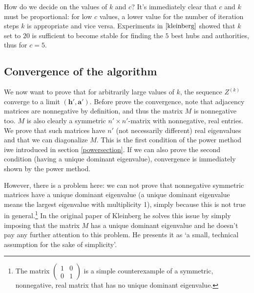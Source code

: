\documentclass[a4paper,11pt]{report}
\begin{document}
How do we decide on the values of $k$ and $c$? It's immediately clear that $c$ and $k$ must
be proportional: for low $c$ values, a lower 
value for the number of iteration steps $k$ is appropriate and vice versa. 
Experiments in $\cite{kleinberg}$ showed that $k$ set to $20$ is sufficient to 
become stable for finding the $5$ best hubs and authorities, thus for $c = 5$. 

\subsection{Convergence of the algorithm}
We now want to prove that for arbitrarily large values of $k$, the
sequence $Z^{(k)}$ converge to a limit $(\mathbf{h'}, \mathbf{a'})$. Before 
  prove the convergence, note that  adjacency matrices are nonnegative by definition, and thus the matrix $M$ is 
nonnegative too. $M$ is also clearly a symmetric $n' \times n'$-matrix with nonnegative, real entries. We prove that such matrices
have  $n'$ (not necessarily different) real eigenvalues and that we can diagonalize $M$.   This is the first condition of the  
power method iwe introduced in section \ref{powersection}.
If we can also prove the second condition (having a unique dominant eigenvalue), 
convergence is immediately shown by the power method.

However, there is a problem here: we can not prove that nonnegative symmetric matrices have a unique dominant 
eigenvalue (a unique dominant eigenvalue means the largest eigenvalue with multiplicity 1), simply because this is not true in general.\footnote{The matrix $\begin{pmatrix} 
1 & 0\\
0 & 1
\end{pmatrix}$ is a simple counterexample of a symmetric, nonnegative, real matrix that has no unique dominant eigenvalue.} 
In the original paper of Kleinberg \cite{kleinberg} he solves this issue by 
simply imposing that the matrix $M$ has a unique dominant eigenvalue and he doesn't pay any further attention to this problem.  
He presents it as `a small, technical assumption for the sake of simplicity'.
\end{document}

